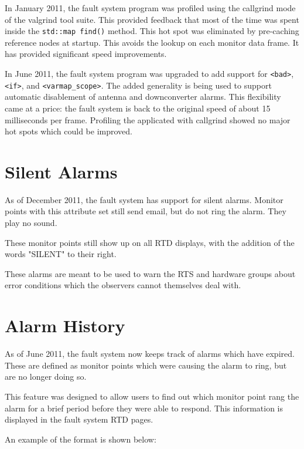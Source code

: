 \documentclass[letterpaper,12pt,oneside,pdftex]{article}
\begin{document}
In January 2011, the fault system program was profiled using the callgrind mode
of the valgrind tool suite. This provided feedback that most of the time was
spent inside the \verb|std::map find()| method. This hot spot was eliminated by
pre-caching reference nodes at startup. This avoids the lookup on each monitor
data frame. It has provided significant speed improvements.

In June 2011, the fault system program was upgraded to add support for
\verb|<bad>|, \verb|<if>|, and \verb|<varmap_scope>|. The added generality is
being used to support automatic disablement of antenna and downconverter alarms.
This flexibility came at a price: the fault system is back to the original speed
of about 15 milliseconds per frame. Profiling the applicated with callgrind
showed no major hot spots which could be improved.

\section{Silent Alarms}

As of December 2011, the fault system has support for silent alarms. Monitor
points with this attribute set still send email, but do not ring the alarm. They
play no sound.

These monitor points still show up on all RTD displays, with the addition of the
words "SILENT" to their right.

These alarms are meant to be used to warn the RTS and hardware groups about
error conditions which the observers cannot themselves deal with.

\section{Alarm History}

As of June 2011, the fault system now keeps track of alarms which have expired.
These are defined as monitor points which were causing the alarm to ring, but
are no longer doing so.

This feature was designed to allow users to find out which monitor point rang
the alarm for a brief period before they were able to respond. This information
is displayed in the fault system RTD pages.

An example of the format is shown below:
\end{document}
